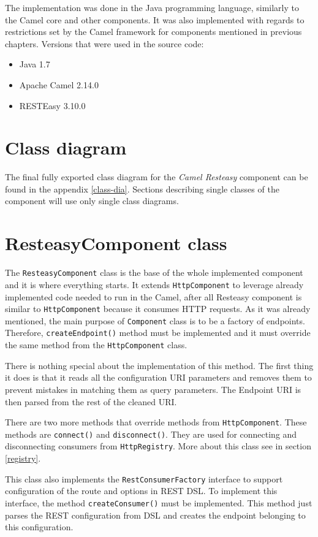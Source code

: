 \documentclass[12pt,final,oneside]{fithesis2}
\begin{document}
The implementation was done in the Java programming language, similarly to the Camel core and other components. It was also implemented with regards to restrictions set by the Camel framework for components mentioned in previous chapters. Versions that were used in the source code:
\begin{itemize}
\item
Java 1.7

\item
Apache Camel 2.14.0

\item
RESTEasy 3.10.0
\end{itemize}

\section{Class diagram}
The final fully exported class diagram for the \textit{Camel Resteasy} component can be found in the appendix \ref{class-dia}. Sections describing single classes of the component will use only single class diagrams.

\section{ResteasyComponent class}
The \texttt{ResteasyComponent} class is the base of the whole implemented component and it is where everything starts. It extends \texttt{HttpComponent} to leverage already implemented code needed to run in the Camel, after all Resteasy component is similar to \texttt{HttpComponent} because it consumes HTTP requests. As it was already mentioned, the main purpose of \texttt{Component} class is to be a factory of endpoints. Therefore, \texttt{createEndpoint()} method must be implemented and it must override the same method from the \texttt{HttpComponent} class.

There is nothing special about the implementation of this method. The first thing it does is that it reads all the configuration URI parameters and removes them to prevent mistakes in matching them as query parameters. The Endpoint URI is then parsed from the rest of the cleaned URI.

There are two more methods that override methods from \texttt{HttpCom\-ponent}. These methods are \texttt{connect()} and \texttt{disconnect()}. They are used for connecting and disconnecting consumers from \texttt{HttpRegistry}. More about this class see in section \ref{registry}. 

This class also implements the \texttt{RestConsumerFactory} interface to support configuration of the route and options in REST DSL. To implement this interface, the method \texttt{createConsumer()} must be implemented. This method just parses the REST configuration from DSL and creates the endpoint belonging to this configuration.
\end{document}
